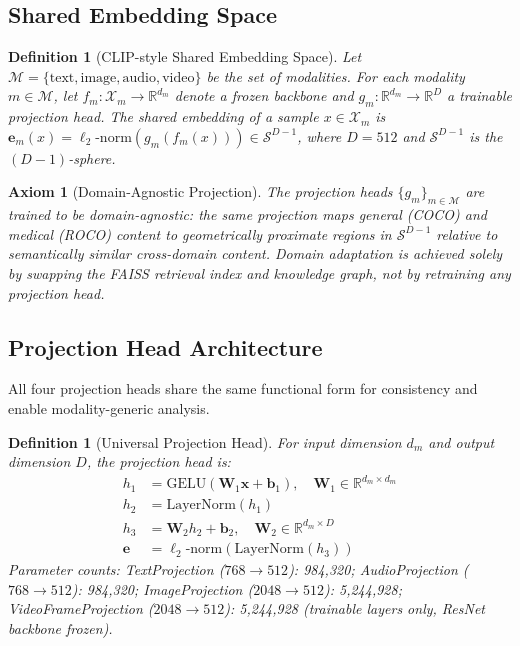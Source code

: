 \documentclass[10pt,conference]{IEEEtran}
\theoremstyle{ieeethm}
\theoremstyle{ieeedef}
\newtheorem{definition}[theorem]{Definition}
\newtheorem{axiom}{Axiom}
\theoremstyle{ieeeremark}
\begin{document}
\subsection{Shared Embedding Space}

\begin{definition}[CLIP-style Shared Embedding Space]
\label{def:shared_space}
Let $\mathcal{M} = \{\text{text}, \text{image}, \text{audio}, \text{video}\}$ be the set of modalities. For each modality $m \in \mathcal{M}$, let $f_m : \mathcal{X}_m \rightarrow \mathbb{R}^{d_m}$ denote a frozen backbone and $g_m : \mathbb{R}^{d_m} \rightarrow \mathbb{R}^D$ a trainable projection head. The shared embedding of a sample $x \in \mathcal{X}_m$ is $\mathbf{e}_m(x) = \ell_2\text{-norm}(g_m(f_m(x))) \in \mathcal{S}^{D-1}$, where $D = 512$ and $\mathcal{S}^{D-1}$ is the $(D{-}1)$-sphere.
\end{definition}

\begin{axiom}[Domain-Agnostic Projection]
\label{ax:domain_agnostic}
The projection heads $\{g_m\}_{m \in \mathcal{M}}$ are trained to be domain-agnostic: the same projection maps general (COCO) and medical (ROCO) content to geometrically proximate regions in $\mathcal{S}^{D-1}$ relative to semantically similar cross-domain content. Domain adaptation is achieved solely by swapping the FAISS retrieval index and knowledge graph, not by retraining any projection head.
\end{axiom}

\subsection{Projection Head Architecture}

All four projection heads share the same functional form for consistency and enable modality-generic analysis.

\begin{definition}[Universal Projection Head]
\label{def:proj_head}
For input dimension $d_m$ and output dimension $D$, the projection head is:
\begin{align}
h_1 &= \text{GELU}(\mathbf{W}_1 \mathbf{x} + \mathbf{b}_1), \quad \mathbf{W}_1 \in \mathbb{R}^{d_m \times d_m} \label{eq:proj1}\\
h_2 &= \text{LayerNorm}(h_1) \label{eq:proj2}\\
h_3 &= \mathbf{W}_2 h_2 + \mathbf{b}_2, \quad \mathbf{W}_2 \in \mathbb{R}^{d_m \times D} \label{eq:proj3}\\
\mathbf{e} &= \ell_2\text{-norm}(\text{LayerNorm}(h_3)) \label{eq:proj4}
\end{align}
Parameter counts: TextProjection ($768 \rightarrow 512$): 984,320; AudioProjection ($768 \rightarrow 512$): 984,320; ImageProjection ($2048 \rightarrow 512$): 5,244,928; VideoFrameProjection ($2048 \rightarrow 512$): 5,244,928 (trainable layers only, ResNet backbone frozen).
\end{definition}
\end{document}
